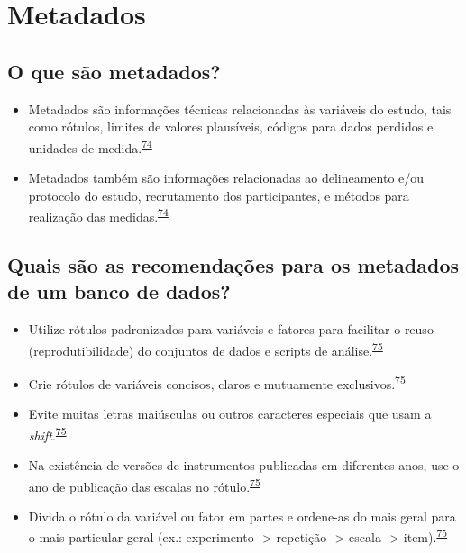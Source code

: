 \documentclass[
  a4paper,
]{book}
\begin{document}
\hypertarget{metadados}{%
\section{Metadados}\label{metadados}}

\hypertarget{o-que-suxe3o-metadados}{%
\subsection{O que são metadados?}\label{o-que-suxe3o-metadados}}

\begin{itemize}
\item
  Metadados são informações técnicas relacionadas às variáveis do estudo, tais como rótulos, limites de valores plausíveis, códigos para dados perdidos e unidades de medida.\textsuperscript{\protect\hyperlink{ref-Baillie2022}{74}}
\item
  Metadados também são informações relacionadas ao delineamento e/ou protocolo do estudo, recrutamento dos participantes, e métodos para realização das medidas.\textsuperscript{\protect\hyperlink{ref-Baillie2022}{74}}
\end{itemize}

\hypertarget{quais-suxe3o-as-recomendauxe7uxf5es-para-os-metadados-de-um-banco-de-dados}{%
\subsection{Quais são as recomendações para os metadados de um banco de dados?}\label{quais-suxe3o-as-recomendauxe7uxf5es-para-os-metadados-de-um-banco-de-dados}}

\begin{itemize}
\item
  Utilize rótulos padronizados para variáveis e fatores para facilitar o reuso (reprodutibilidade) do conjuntos de dados e scripts de análise.\textsuperscript{\protect\hyperlink{ref-buttliere2021}{75}}
\item
  Crie rótulos de variáveis concisos, claros e mutuamente exclusivos.\textsuperscript{\protect\hyperlink{ref-buttliere2021}{75}}
\item
  Evite muitas letras maiúsculas ou outros caracteres especiais que usam a \emph{shift}.\textsuperscript{\protect\hyperlink{ref-buttliere2021}{75}}
\item
  Na existência de versões de instrumentos publicadas em diferentes anos, use o ano de publicação das escalas no rótulo.\textsuperscript{\protect\hyperlink{ref-buttliere2021}{75}}
\item
  Divida o rótulo da variável ou fator em partes e ordene-as do mais geral para o mais particular geral (ex.: experimento -\textgreater{} repetição -\textgreater{} escala -\textgreater{} item).\textsuperscript{\protect\hyperlink{ref-buttliere2021}{75}}
\end{itemize}
\end{document}
